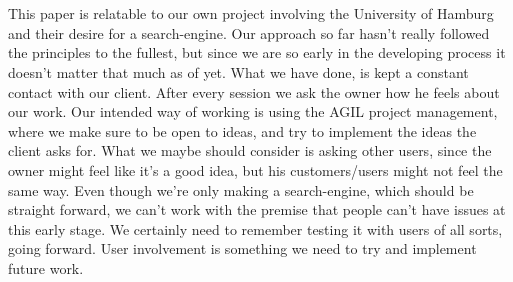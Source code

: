 \documentclass[12pt,a4paper]{article}
\begin{document}
\\
\\
This paper is relatable to our own project involving the University of Hamburg and their desire for a search-engine. Our approach so far hasn't really followed the principles to the fullest, but since we are so early in the developing process it doesn't matter that much as of yet. What we have done, is kept a constant contact with our client. After every session we ask the owner how he feels about our work. Our intended way of working is using the AGIL project management, where we make sure to be open to ideas, and try to implement the ideas the client asks for. What we maybe should consider is asking other users, since the owner might feel like it's a good idea, but his customers/users might not feel the same way. Even though we're only making a search-engine, which should be straight forward, we can't work with the premise that people can't have issues at this early stage. We certainly need to remember testing it with users of all sorts, going forward. User involvement is something we need to try and implement future work.
\newpage
\end{document}
